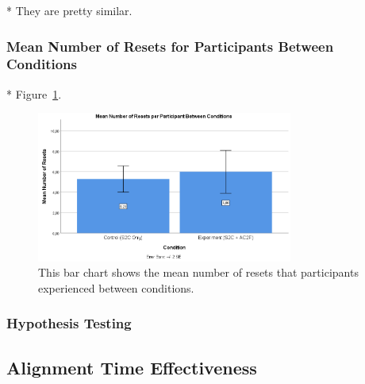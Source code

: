 * They are pretty similar.

\subsubsection{Mean Number of Resets for Participants Between Conditions}
* Figure~\ref{fig:ex2resetMeans}.
\begin{figure}[tbph]
    \centering
    \includegraphics[width=0.75\textwidth]{figures/graphs/ResetMeans.png}
    \caption[Mean Number of Resets Between Conditions]{This bar chart shows the mean number of resets that participants experienced between conditions.}
    \label{fig:ex2resetMeans}
\end{figure}

\subsubsection{Hypothesis Testing}

\subsection{Alignment Time Effectiveness}